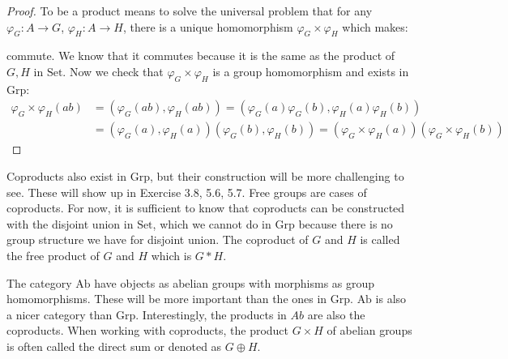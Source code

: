 \documentclass{report}
\begin{document}
\begin{proof}
    To be a product means to solve the universal problem that for any $\varphi_{G}: A \rightarrow G$, $\varphi_{H} : A \rightarrow H$, there is a unique homomorphism $\varphi_{G} \times \varphi_{H}$ which makes:
        \begin{center}
        \end{center}
    commute. We know that it commutes because it is the same as the product of $G, H$ in $\text{Set}$. Now we check that $\varphi_{G} \times \varphi_{H}$ is a group homomorphism and exists in $\text{Grp}$:
        \begin{align*}
            \varphi_{G} \times \varphi_{H}(ab) &= (\varphi_{G}(ab), \varphi_{H}(ab)) = (\varphi_{G}(a)\varphi_{G}(b), \varphi_{H}(a)\varphi_{H}(b))                                         \\
                                               &= (\varphi_{G}(a), \varphi_{H}(a))(\varphi_{G}(b), \varphi_{H}(b)) = (\varphi_{G} \times \varphi_{H}(a))(\varphi_{G} \times \varphi_{H}(b))   
        \end{align*}
\end{proof}

Coproducts also exist in $\text{Grp}$, but their construction will be more challenging to see. These will show up in Exercise 3.8, 5.6, 5.7. Free groups are cases of coproducts. For now, it is sufficient to know that coproducts can be constructed with the disjoint union in $\text{Set}$, which we cannot do in $\text{Grp}$ because there is no group structure we have for disjoint union. The coproduct of $G$ and $H$ is called the free product of $G$ and $H$ which is $G * H$.

The category $\text{Ab}$ have objects as abelian groups with morphisms as group homomorphisms. These will be more important than the ones in $\text{Grp}$. $\text{Ab}$ is also a nicer category than $\text{Grp}$. Interestingly, the products in $Ab$ are also the coproducts. When working with coproducts, the product $G \times H$ of abelian groups is often called the direct sum or denoted as $G \oplus H$.
\end{document}
